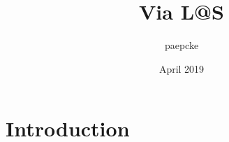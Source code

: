 \documentclass{article}
\title{Via L@S}
\author{paepcke }
\date{April 2019}
\begin{document}
\maketitle

\section{Introduction}
\end{document}
